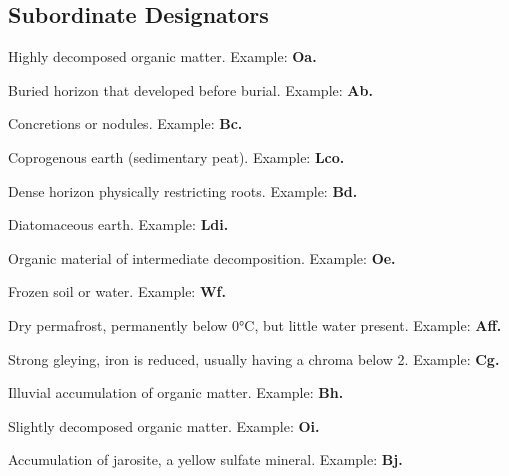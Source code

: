 \documentclass[12pt]{exam}
\begin{document}
\newpage
\begin{center}
    \section*{Subordinate Designators}
\end{center}
    \hrulefill

\begin{description}[labelsep=1.80em, align=right]
\item[a]
Highly decomposed organic matter. Example: \textbf{Oa.}
\vspace{0.1in}
\item[b]
Buried horizon that developed before burial. Example: \textbf{Ab.}
\vspace{0.1in}
\item[c]
Concretions or nodules. Example: \textbf{Bc.}
\vspace{0.1in}
\item[co]
Coprogenous earth (sedimentary peat). Example: \textbf{Lco.}
\vspace{0.1in}
\item[d]
Dense horizon physically restricting roots. Example: \textbf{Bd.}
\vspace{0.1in}
\item[di]
Diatomaceous earth. Example: \textbf{Ldi.}
\vspace{0.1in}
\item[e]
Organic material of intermediate decomposition. Example: \textbf{Oe.}
\vspace{0.1in}
\item[f] 
Frozen soil or water. Example: \textbf{Wf.}
\vspace{0.1in}
\item[ff] 
Dry permafrost, permanently below 0°C, but little water present. Example: \textbf{Aff.}
\vspace{0.1in}
\item[g] 
Strong gleying, iron is reduced, usually having a chroma below 2. Example: \textbf{Cg.}
\vspace{0.1in}
\item[h]
Illuvial accumulation of organic matter. Example: \textbf{Bh.}
\vspace{0.1in}
\item[i]
Slightly decomposed organic matter. Example: \textbf{Oi.}
\vspace{0.1in}
\item[j]
Accumulation of jarosite, a yellow sulfate mineral. Example: \textbf{Bj.}
\vspace{0.1in}

\end{description}
\end{document}
